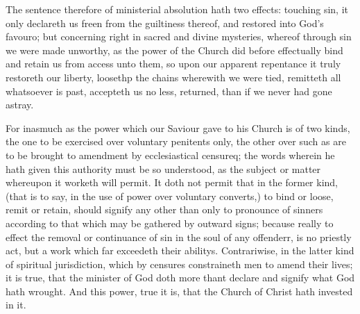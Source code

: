 The sentence therefore of ministerial absolution hath two effects: touching sin, it only declareth us freen from the guiltiness thereof, and restored into God’s favouro; but concerning right in sacred and divine mysteries, whereof through sin we were made unworthy, as the power of the Church did before effectually bind and retain us from access unto them, so upon our apparent repentance it truly restoreth our liberty, loosethp the chains wherewith we were tied, remitteth all whatsoever is past, accepteth us no less, returned, than if we never had gone astray.

For inasmuch as the power which our Saviour gave to his Church is of two kinds, the one to be exercised over voluntary penitents only, the other over such as are to be brought to amendment by ecclesiastical censureq; the words wherein he hath given this authority must be so understood, as the subject or matter whereupon it worketh will permit. It doth not permit that in the former kind, (that is to say, in the use of power over voluntary converts,) to bind or loose, remit or retain, should signify any other than only to pronounce of sinners according to that which may be gathered by outward signs; because really to effect the removal or continuance of sin in the soul of any offenderr, is no priestly act, but a work which far exceedeth their abilitys. Contrariwise, in the latter  kind of spiritual jurisdiction, which by censures constraineth men to amend their lives; it is true, that the minister of God doth more thant declare and signify what God hath wrought. And this power, true it is, that the Church of Christ hath invested in it.

